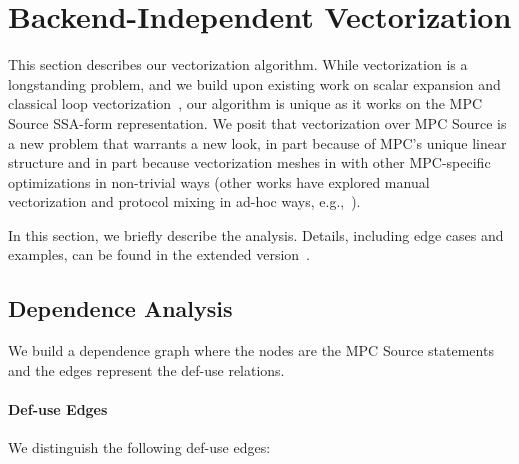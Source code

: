 
\section{Backend-Independent Vectorization}
\label{sec:vectorization}


This section describes our vectorization algorithm. While vectorization is a longstanding problem, 
and we build upon existing work on scalar expansion and classical loop vectorization~\cite{Allen:1987}, 
our algorithm is unique as it works on the MPC Source SSA-form representation. We posit that vectorization 
over MPC Source is a new problem that warrants a new look, in part because of MPC's unique linear 
structure and in part because vectorization meshes in with other MPC-specific optimizations in non-trivial ways
(other works have explored manual vectorization and protocol mixing in ad-hoc ways, e.g.,~\cite{Ishaq:2019}).

In this section, we briefly describe the analysis. Details, including edge cases and examples, can be found in the extended version~\cite{Anon_TR}.

\subsection{Dependence Analysis}
\label{sec:dependence}

We build a dependence graph where the nodes are the MPC Source statements and the edges represent the def-use relations.

\paragraph{Def-use Edges} We distinguish the following def-use edges:

